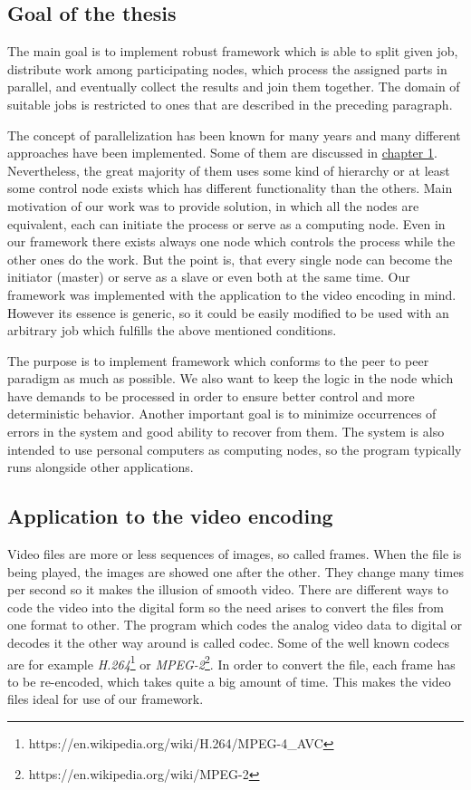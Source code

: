 \subsection*{Goal of the thesis} %
The main goal is to implement robust framework which is able to split given job, distribute work among participating nodes, which process the assigned parts in parallel, and eventually collect the results and join them together. The domain of suitable jobs is restricted to ones that are described in the preceding paragraph.

The concept of parallelization has been known for many years and many different approaches have been implemented. Some of them are discussed in \hyperref[existing-solutions]{chapter 1}. Nevertheless, the great majority of them uses some kind of hierarchy or at least some control node exists which has different functionality than the others. Main motivation of our work was to provide solution, in which all the nodes are equivalent, each can initiate the process or serve as a computing node. Even in our framework there exists always one node which controls the process while the other ones do the work. But the point is, that every single node can become the initiator (master) or serve as a slave or even both at the same time. Our framework was implemented with the application to the video encoding in mind. However its essence is generic, so it could be easily modified to be used with an arbitrary job which fulfills the above mentioned conditions.

The purpose is to implement framework which conforms to the peer to peer paradigm as much as possible. We also want to keep the logic in the node which have demands to be processed in order to ensure better control and more deterministic behavior. Another important goal is to minimize occurrences of errors in the system and good ability to recover from them. The system is also intended to use personal computers as computing nodes, so the program typically runs alongside other applications.


\subsection*{Application to the video encoding}
Video files are more or less sequences of images, so called frames. When the file is being played, the images are showed one after the other. They change many times per second so it makes the illusion of smooth video. There are different ways to code the video into the digital form so the need arises to convert the files from one format to other. The program which codes the analog video data to digital or decodes it the other way around is called codec. Some of the well known codecs are for example \textit{H.264}\footnote{https://en.wikipedia.org/wiki/H.264/MPEG-4\_AVC} or \textit{MPEG-2}\footnote{https://en.wikipedia.org/wiki/MPEG-2}. In order to convert the file, each frame has to be re-encoded, which takes quite a big amount of time. This makes the video files ideal for use of our framework.

